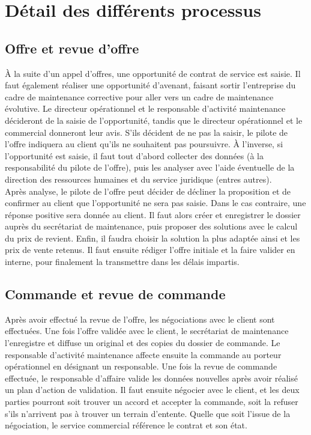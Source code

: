 \section{Détail des différents processus}

\subsection{Offre et revue d'offre}

À la suite d'un appel d'offres, une opportunité de contrat de service est saisie. Il faut également réaliser une opportunité d'avenant, faisant sortir l'entreprise du cadre de maintenance corrective pour aller vers un cadre de maintenance évolutive. Le directeur opérationnel et le responsable d'activité maintenance décideront de la saisie de l'opportunité, tandis que le directeur opérationnel et le commercial donneront leur avis. S'ils décident de ne pas la saisir, le pilote de l'offre indiquera au client qu'ils ne souhaitent pas poursuivre. À l'inverse, si l'opportunité est saisie, il faut tout d'abord collecter des données (à la responsabilité du pilote de l'offre), puis les analyser avec l'aide éventuelle de la direction des ressources humaines et du service juridique (entres autres). \\

Après analyse, le pilote de l'offre peut décider de décliner la proposition et de confirmer au client que l'opportunité ne sera pas saisie. Dans le cas contraire, une réponse positive sera donnée au client. Il faut alors créer et enregistrer le dossier auprès du secrétariat de maintenance, puis proposer des solutions avec le calcul du prix de revient. Enfin, il faudra choisir la solution la plus adaptée ainsi et les prix de vente retenus. Il faut ensuite rédiger l'offre initiale et la faire valider en interne, pour finalement la transmettre dans les délais impartis.


\subsection{Commande et revue de commande}

Après avoir effectué la revue de l'offre, les négociations avec le client sont effectuées. Une fois l'offre validée avec le client, le secrétariat de maintenance l'enregistre et diffuse un original et des copies du dossier de commande. Le responsable d'activité maintenance affecte ensuite la commande au porteur opérationnel en désignant un responsable. Une fois la revue de commande effectuée, le responsable d'affaire valide les données nouvelles après avoir réalisé un plan d'action de validation. Il faut ensuite négocier avec le client, et les deux parties pourront soit trouver un accord et accepter la commande, soit la refuser s'ils n'arrivent pas à trouver un terrain d'entente. Quelle que soit l'issue de la négociation, le service commercial référence le contrat et son état.

